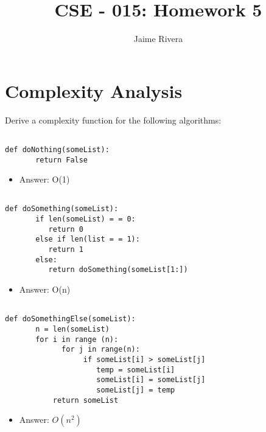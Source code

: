 \documentclass[11pt]{article}
\title{CSE - 015: Homework 5}
\author{Jaime Rivera}
\begin{document}
\maketitle

\section{Complexity Analysis}

Derive a complexity function for the following algorithms:

\begin{lstlisting}

def doNothing(someList):
       return False

\end{lstlisting}


\begin{itemize}

\item Answer: O(1)

\end{itemize} 


\begin{lstlisting}

def doSomething(someList):
       if len(someList) = = 0:
          return 0
       else if len(list = = 1):
          return 1
       else:
          return doSomething(someList[1:])

\end{lstlisting}


\begin{itemize}

\item Answer: O(n)

\end{itemize} 



\begin{lstlisting}

def doSomethingElse(someList):
       n = len(someList)
       for i in range (n):
             for j in range(n):
                  if someList[i] > someList[j]
                     temp = someList[i]
                     someList[i] = someList[j]
                     someList[j] = temp
           return someList

\end{lstlisting}


\begin{itemize}

\item Answer: $O(n^{2})$

\end{itemize} 
\end{document}
